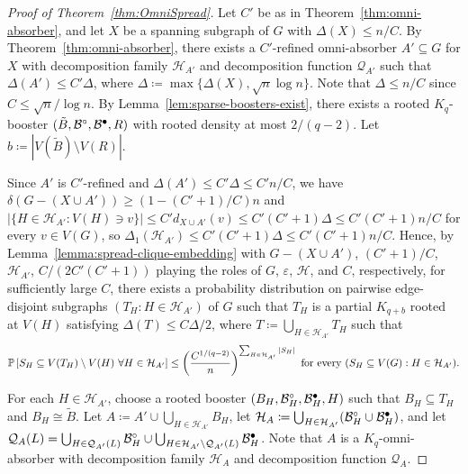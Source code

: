 \documentclass[11pt]{article}
\numberwithin{equation}{section}
\newcommand{\eps}{\varepsilon}
\newcounter{i}
\theoremstyle{plain}
\theoremstyle{plain} %
\theoremstyle{definition}
\newcommand{\cQ}{\mathcal{Q}}
\newcommand{\cB}{\mathcal{B}}
\newcommand{\cH}{\mathcal{H}}
\newcommand{\Prob}[1]{\ensuremath{%
\mathbb P\left[#1\right]
}}
\newcommand\filledcirc{\ensuremath{{\bullet}\mathllap{\circ}}}
\begin{document}
\begin{proof}[Proof of Theorem~\ref{thm:OmniSpread}]
    Let $C'$ be as in Theorem~\ref{thm:omni-absorber}, and let $X$ be a spanning subgraph of $G$ with $\Delta(X) \leq n / C$.
    By Theorem~\ref{thm:omni-absorber}, there exists a $C'$-refined omni-absorber $A' \subseteq G$ for $X$ with decomposition family $\cH_{A'}$ and decomposition function $\cQ_{A'}$ such that $\Delta(A') \leq C'\Delta$, where $\Delta \coloneqq \max\{\Delta(X), \sqrt{n}\log n\}$.  
    Note that $\Delta \leq n / C$ since $C \leq \sqrt{n}/\log n$.
    By Lemma~\ref{lem:sparse-boosters-exist}, there exists a rooted $K_q$-booster $(\tilde{B}, \cB^{\circ}, \cB^{\filledcirc}, R)$ with rooted density at most $2/(q-2)$.  Let $b \coloneqq |V(\tilde B)\setminus V(R)|$. 


    Since $A'$ is $C'$-refined and $\Delta(A') \leq C'\Delta \leq C' n / C$, we have $\delta(G - (X\cup A')) \geq (1 - (C'+1)/C)n$ and $|\{H \in \cH_{A'} : V(H) \ni v\}| \leq C'd_{X\cup A'}(v) \leq C'(C' + 1)\Delta \leq C'(C' + 1)n / C$ for every $v \in V(G)$, so $\Delta_1(\cH_{A'}) \leq C'(C' + 1)\Delta \leq C'(C' + 1)n/C$.
    Hence, by Lemma~\ref{lemma:spread-clique-embedding} with $G - (X \cup A')$, $(C' + 1) / C$, $\cH_{A'}$, $C / (2C'(C' + 1))$ playing the roles of $G$, $\eps$, $\cH$, and $C$, respectively, for sufficiently large $C$, there exists a probability distribution on pairwise edge-disjoint subgraphs $(T_H : H \in \cH_{A'})$ of $G$ such that $T_H$ is a partial $K_{q + b}$ rooted at $V(H)$ satisfying $\Delta(T) \leq C\Delta/2$, where $T \coloneqq \bigcup_{H\in\cH_{A'}}T_H$ such that
    \begin{equation}\label{eqn:vertex-spreadness-boosters}
        \Prob{S_H \subseteq V(T_H)\setminus V(H)~\forall H \in \cH_{A'}} \leq \left(\frac{C^{1/(q-2)}}{n}\right)^{\sum_{H\in \cH_{A'}}|S_H|} \text{ for every } (S_H \subseteq V(G) : H \in \cH_{A'}). 
    \end{equation}
    
    For each $H \in \cH_{A'}$, choose a rooted booster $(B_H, \cB_H^{\circ}, \cB_H^{\filledcirc}, H)$ such that $B_H \subseteq T_H$ and $B_H \cong \tilde{B}$.  
    Let $A \coloneqq A' \cup \bigcup_{H\in \cH_{A'}}B_H$, let $\cH_A \coloneqq \bigcup_{H \in \cH_{A'}}(\cB_H^{\circ} \cup \cB_H^{\filledcirc})$, and let $\cQ_A(L) = \bigcup_{H\in\cQ_{A'}(L)}\cB^{\circ}_H \cup \bigcup_{H\in\cH_{A'}\setminus\cQ_{A'}(L)}\cB^{\filledcirc}_H$.  Note that $A$ is a $K_q$-omni-absorber with decomposition family $\cH_A$ and decomposition function $\cQ_A$.
    

\end{proof}
\end{document}
